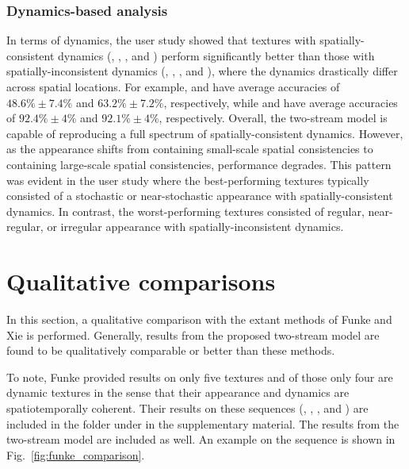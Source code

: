 \subsubsection{Dynamics-based analysis}

In terms of dynamics, the user study showed that textures with
spatially-consistent dynamics (\eg, , 
, and  ) perform 
significantly better than those with spatially-inconsistent 
dynamics (\eg, , , 
and ), where the dynamics drastically differ 
across spatial locations.
For example,  and 
have average accuracies of $48.6\% \pm 7.4\%$ and
$63.2\% \pm 7.2\%$, respectively, while
 and  have average 
accuracies of $92.4\% \pm 4\%$ and $92.1\% \pm 4\%$, 
respectively.
Overall, the two-stream model is capable of reproducing a full spectrum
of spatially-consistent dynamics.
However, as the appearance shifts from containing small-scale 
spatial consistencies to containing large-scale spatial consistencies,
performance degrades.
This pattern was evident in the user study where the best-performing 
textures typically consisted of a stochastic or
near-stochastic appearance with spatially-consistent 
dynamics.
In contrast, the worst-performing textures consisted of
regular, near-regular, or irregular appearance with
spatially-inconsistent dynamics.

\section{Qualitative comparisons}

In this section, a qualitative comparison with the extant methods of Funke 
\etal \cite{funke2017} and Xie \etal \cite{xie2017synthesizing} is performed.
Generally, results from the proposed two-stream model are found to be qualitatively comparable or better than these methods.

To note, Funke \etal provided results on
only five textures and of those only four
are dynamic textures in the sense that their appearance
and dynamics are spatiotemporally coherent.
Their results on these sequences (, , 
, and ) are included in the folder
 under  in the supplementary material. The results from the two-stream model are included as well. An example on the  sequence is shown in Fig.\ \ref{fig:funke_comparison}.

